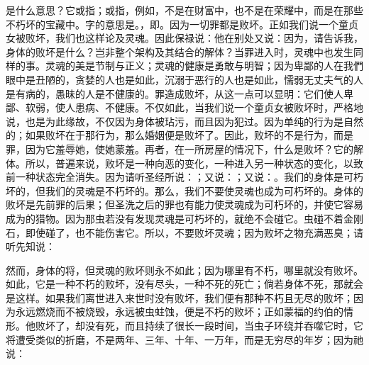 是什么意思？它或指；或指，例如，不是在财富中，也不是在荣耀中，而是在那些不朽坏的宝藏中。字的意思是。，即。因为一切罪都是败坏。正如我们说一个童贞女被败坏，我们也这样论及灵魂。因此保禄说：他在别处又说：因为，请告诉我，身体的败坏是什么？岂非整个架构及其结合的解体？当罪进入时，灵魂中也发生同样的事。灵魂的美是节制与正义；灵魂的健康是勇敢与明智；因为卑鄙的人在我們眼中是丑陋的，贪婪的人也是如此，沉溺于恶行的人也是如此，懦弱无丈夫气的人是有病的，愚昧的人是不健康的。罪造成败坏，从这一点可以显明：它们使人卑鄙、软弱，使人患病、不健康。不仅如此，当我们说一个童贞女被败坏时，严格地说，也是为此缘故，不仅因为身体被玷污，而且因为犯过。因为单纯的行为是自然的；如果败坏在于那行为，那么婚姻便是败坏了。因此，败坏的不是行为，而是罪，因为它羞辱她，使她蒙羞。再者，在一所房屋的情况下，什么是败坏？它的解体。所以，普遍来说，败坏是一种向恶的变化，一种进入另一种状态的变化，以致前一种状态完全消失。因为请听圣经所说：；又说：；又说：。我们的身体是可朽坏的，但我们的灵魂是不朽坏的。那么，我们不要使灵魂也成为可朽坏的。身体的败坏是先前罪的后果；但圣洗之后的罪也有能力使灵魂成为可朽坏的，并使它容易成为的猎物。因为那虫若没有发现灵魂是可朽坏的，就绝不会碰它。虫碰不着金刚石，即使碰了，也不能伤害它。所以，不要败坏灵魂；因为败坏之物充满恶臭；请听先知说：\par

然而，身体的将，但灵魂的败坏则永不如此；因为哪里有不朽，哪里就没有败坏。如此，它是一种不朽的败坏，没有尽头，一种不死的死亡；倘若身体不死，那就会是这样。如果我们离世进入来世时没有败坏，我们便有那种不朽且无尽的败坏；因为永远燃烧而不被烧毁，永远被虫蛀蚀，便是不朽的败坏；正如蒙福的约伯的情形。他败坏了，却没有死，而且持续了很长一段时间，当虫子环绕并吞噬它时，它将遭受类似的折磨，不是两年、三年、十年、一万年，而是无穷尽的年岁；因为祂说：\par

